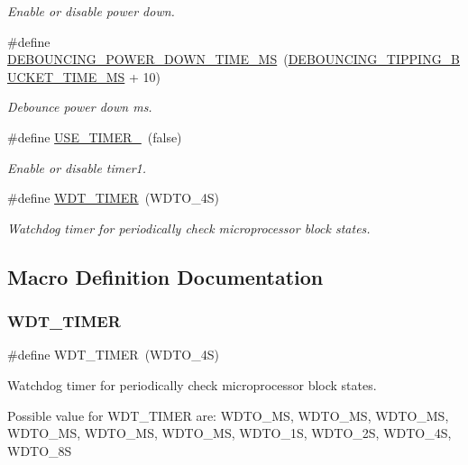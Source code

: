 \begin{DoxyCompactItemize}
\begin{DoxyCompactList}\small\item\em Enable or disable power down. \end{DoxyCompactList}\item 
\mbox{\label{i2c-rain-config_8h_a7b9497e328b8f872cd7677cfd02bbf65}} 
\#define \hyperlink{i2c-rain-config_8h_a7b9497e328b8f872cd7677cfd02bbf65}{D\+E\+B\+O\+U\+N\+C\+I\+N\+G\+\_\+\+P\+O\+W\+E\+R\+\_\+\+D\+O\+W\+N\+\_\+\+T\+I\+M\+E\+\_\+\+MS}~(\hyperlink{i2c-rain-config_8h_a96fb36600c0cea5d22644c26e2d1c7e8}{D\+E\+B\+O\+U\+N\+C\+I\+N\+G\+\_\+\+T\+I\+P\+P\+I\+N\+G\+\_\+\+B\+U\+C\+K\+E\+T\+\_\+\+T\+I\+M\+E\+\_\+\+MS} + 10)
\begin{DoxyCompactList}\small\item\em Debounce power down ms. \end{DoxyCompactList}\item 
\mbox{\label{i2c-rain-config_8h_a8051c2a569a9f9c488af89bce47ec306}} 
\#define \hyperlink{i2c-rain-config_8h_a8051c2a569a9f9c488af89bce47ec306}{U\+S\+E\+\_\+\+T\+I\+M\+E\+R\+\_}~(false)
\begin{DoxyCompactList}\small\item\em Enable or disable timer1. \end{DoxyCompactList}\item 
\#define \hyperlink{i2c-rain-config_8h_a983c9777673ee873f12ec9f489215321}{W\+D\+T\+\_\+\+T\+I\+M\+ER}~(W\+D\+T\+O\+\_\+4S)
\begin{DoxyCompactList}\small\item\em Watchdog timer for periodically check microprocessor block states. \end{DoxyCompactList}\end{DoxyCompactItemize}


\subsection{Macro Definition Documentation}
\mbox{\label{i2c-rain-config_8h_a983c9777673ee873f12ec9f489215321}} 
\subsubsection{\texorpdfstring{W\+D\+T\+\_\+\+T\+I\+M\+ER}{WDT\_TIMER}}
{\footnotesize\ttfamily \#define W\+D\+T\+\_\+\+T\+I\+M\+ER~(W\+D\+T\+O\+\_\+4S)}



Watchdog timer for periodically check microprocessor block states. 

Possible value for W\+D\+T\+\_\+\+T\+I\+M\+ER are\+: W\+D\+T\+O\+\_\+MS, W\+D\+T\+O\+\_\+MS, W\+D\+T\+O\+\_\+MS, W\+D\+T\+O\+\_\+MS, W\+D\+T\+O\+\_\+MS, W\+D\+T\+O\+\_\+MS, W\+D\+T\+O\+\_\+1S, W\+D\+T\+O\+\_\+2S, W\+D\+T\+O\+\_\+4S, W\+D\+T\+O\+\_\+8S 